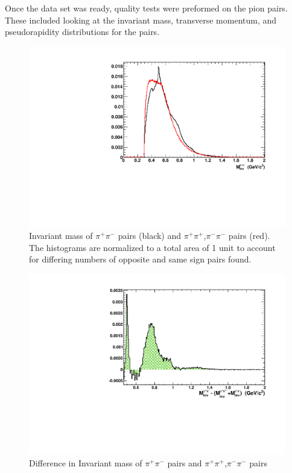 \documentclass[abstract = on,listof=totoc, bibliography=totoc]{scrreprt}
\newcommand{\pip}{\pi^+}
\newcommand{\pim}{\pi^-}
\newcommand{\pair}{$\pip\pim$ }
\begin{document}
Once the data set was ready, quality tests were preformed on the pion pairs. These included looking at the invariant mass, transverse momentum, and pseudorapidity distributions for the pairs.


\begin{figure}
\begin{center}
\includegraphics[width = 1\textwidth]{invMassSameVsOpp4}
\caption[Invariant mass of opposite and same sign pion pairs]{Invariant mass of \pair pairs (black) and $\pi^+\pi^+$,$\pi^-\pi^-$ pairs (red). The histograms are normalized to a total area of 1 unit to account for differing numbers of opposite and same sign pairs found.}
\label{fig:invMSO}
\end{center}
\end{figure}

\begin{figure}
\begin{center}
\includegraphics[width = 1\textwidth]{diffInvMassSameOpp2}
\caption[Difference in the invariant mass of opposite and same sign pion pairs]{Difference in Invariant mass of \pair pairs and $\pi^+\pi^+$,$\pi^-\pi^-$ pairs}
\label{fig:dInvMSO}
\end{center}
\end{figure}
\end{document}
